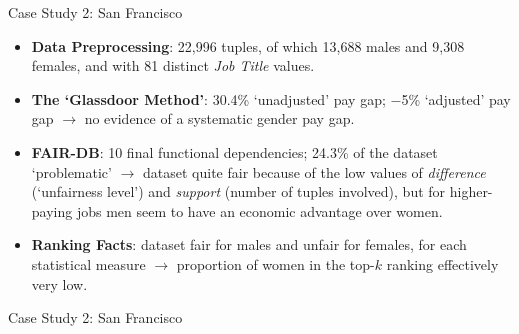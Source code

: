\documentclass[usenames,dvipsnames]{beamer}
\begin{document}
    
    \begin{frame}{Case Study 2: San Francisco}
        \begin{itemize}
            \item \textbf{Data Preprocessing}: 22,996 tuples, of which 13,688 males and 9,308 females, and with 81 distinct \textit{Job Title} values.\newline
            \item \textbf{The `Glassdoor Method'}: 30.4\% `unadjusted' pay gap; \(-\)5\% `adjusted' pay gap $\rightarrow$ no evidence of a systematic gender pay gap.
            \item \textbf{FAIR-DB}: 10 final functional dependencies; 24.3\% of the dataset `problematic' $\rightarrow$ dataset quite fair because of the low values of \textit{difference} (`unfairness level') and \textit{support} (number of tuples involved), but for higher-paying jobs men seem to have an economic advantage over women.
            \item \textbf{Ranking Facts}: dataset fair for males and unfair for females, for each statistical measure $\rightarrow$ proportion of women in the top-\(k\) ranking effectively very low.
        \end{itemize}
    \end{frame}
    
    
    \begin{frame}{Case Study 2: San Francisco}
        \begin{figure}
            \hfill
        \end{figure}
    \end{frame}
    
\end{document}
